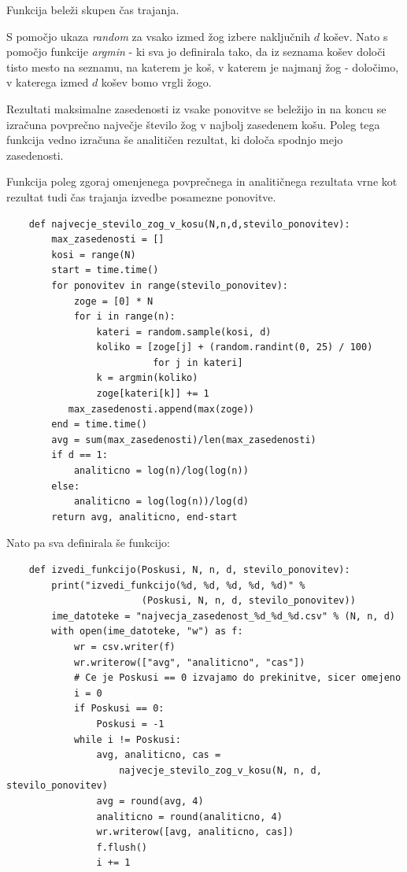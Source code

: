 \documentclass[a4paper, 11pt]{article}
\begin{document}
Funkcija beleži skupen čas trajanja. 

S pomočjo ukaza \emph{random} za vsako izmed
žog izbere naključnih $d$ košev.
Nato s pomočjo funkcije \emph{argmin} - ki sva jo definirala tako,
da iz seznama košev določi tisto mesto na seznamu, na katerem je koš, v katerem je najmanj žog - 
določimo, v katerega izmed $d$ košev bomo vrgli žogo.

Rezultati maksimalne zasedenosti iz vsake ponovitve se beležijo in na koncu se izračuna 
povprečno največje število žog v najbolj zasedenem košu.
Poleg tega funkcija vedno izračuna še analitičen rezultat,
ki določa spodnjo mejo zasedenosti.

Funkcija poleg zgoraj omenjenega povprečnega in analitičnega rezultata
vrne kot rezultat tudi čas trajanja izvedbe posamezne ponovitve.

\begin{verbatim}
    def najvecje_stevilo_zog_v_kosu(N,n,d,stevilo_ponovitev):
        max_zasedenosti = []
        kosi = range(N)
        start = time.time() 
        for ponovitev in range(stevilo_ponovitev):
            zoge = [0] * N       
            for i in range(n):
                kateri = random.sample(kosi, d) 
                koliko = [zoge[j] + (random.randint(0, 25) / 100) 
                          for j in kateri]    
                k = argmin(koliko)      
                zoge[kateri[k]] += 1    
           max_zasedenosti.append(max(zoge))   
        end = time.time() 
        avg = sum(max_zasedenosti)/len(max_zasedenosti) 
        if d == 1:
            analiticno = log(n)/log(log(n)) 
        else:
            analiticno = log(log(n))/log(d) 
        return avg, analiticno, end-start
\end{verbatim}

Nato pa sva definirala še funkcijo:

\begin{verbatim}
    def izvedi_funkcijo(Poskusi, N, n, d, stevilo_ponovitev):
        print("izvedi_funkcijo(%d, %d, %d, %d, %d)" % 
                        (Poskusi, N, n, d, stevilo_ponovitev))
        ime_datoteke = "najvecja_zasedenost_%d_%d_%d.csv" % (N, n, d)
        with open(ime_datoteke, "w") as f: 
            wr = csv.writer(f)
            wr.writerow(["avg", "analiticno", "cas"])
            # Ce je Poskusi == 0 izvajamo do prekinitve, sicer omejeno
            i = 0
            if Poskusi == 0:
                Poskusi = -1
            while i != Poskusi:
                avg, analiticno, cas = 
                    najvecje_stevilo_zog_v_kosu(N, n, d, stevilo_ponovitev)
                avg = round(avg, 4)
                analiticno = round(analiticno, 4)
                wr.writerow([avg, analiticno, cas])
                f.flush() 
                i += 1
\end{verbatim}
\end{document}
